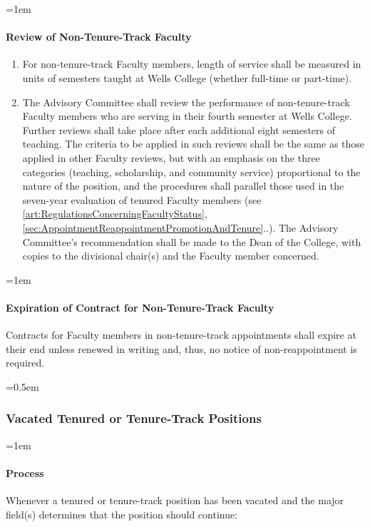 \documentclass{manual}
\let\oldsubsubsection\subsubsection
\renewcommand\subsubsection{\leftskip=0.5em\oldsubsubsection}
\let\oldparagraph\paragraph
\renewcommand\paragraph{\leftskip=1em\oldparagraph}
\newcommand{\itemLevelA}{\alph*.}
\newcommand{\itemRefA}{\alph*}
\begin{document}
\paragraph{Review of Non-Tenure-Track Faculty}\label{par:ReviewOfPartTimeVisitingAndOtherNonTenureTrackOfficersOfInstruction}

	\begin{enumerate}[label=\itemLevelA,ref=\itemRefA]
	\item For non-tenure-track Faculty members, length of service shall be measured in units of semesters taught at Wells College (whether full-time or part-time).
	\item The Advisory Committee shall review the performance of non-tenure-track Faculty members who are serving in their fourth semester at Wells College. Further reviews shall take place after each additional eight semesters of teaching. The criteria to be applied in such reviews shall be the same as those applied in other Faculty reviews, but with an emphasis on the three categories (teaching, scholarship, and community service) proportional to the nature of the position, and the procedures shall parallel those used in the seven-year evaluation of tenured Faculty members (see \cref{art:RegulationsConcerningFacultyStatus}, \cref{sec:AppointmentReappointmentPromotionAndTenure}..). The Advisory Committee's recommendation shall be made to the Dean of the College, with copies to the divisional chair(s) and the Faculty member concerned.
	\end{enumerate}

\paragraph{Expiration of Contract for Non-Tenure-Track Faculty}
Contracts for Faculty members in non-tenure-track appointments shall expire at their end unless renewed in writing and, thus, no notice of non-reappointment is required.

\subsubsection{Vacated Tenured or Tenure-Track Positions}

\paragraph{Process}

Whenever a tenured or tenure-track position has been vacated and the major field(s) determines that the position should continue:
\end{document}
